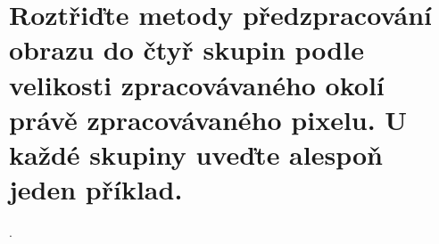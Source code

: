 \section{Roztřiďte metody předzpracování obrazu do čtyř skupin podle velikosti zpracovávaného okolí právě zpracovávaného 
pixelu. U každé skupiny uveďte alespoň jeden příklad.}.